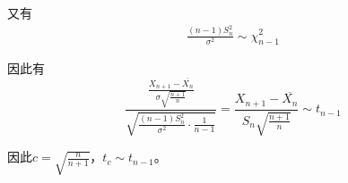 \documentclass[a4paper,12pt]{ctexart}
\begin{document}
又有
\begin{align*}
	\frac{(n-1)S_n^2}{\sigma^2} \sim \chi^2_{n-1}
\end{align*}

因此有
\begin{equation*}
	\frac{\frac{X_{n+1} - \overline{X_n}}{\sigma\sqrt{\frac{n+1}{n}}}}{\sqrt{\frac{(n-1)S_n^2}{\sigma^2} \cdot \frac{1}{n-1}}} = \frac{X_{n+1} - \overline{X_n}}{S_n \sqrt{\frac{n+1}{n}}} \sim t_{n-1}
\end{equation*}

因此$c = \sqrt{\frac{n}{n+1}}$，$t_c \sim t_{n-1}$。
\end{document}
